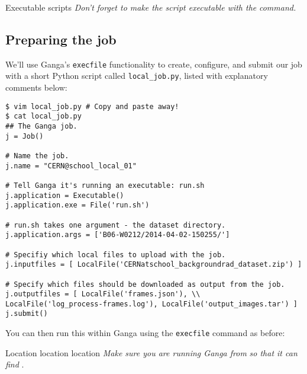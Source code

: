 \begin{warningbox}{Executable scripts}
\emph{Don't forget to make the script executable with the}
\emph{command.}
\end{warningbox}

\subsection{Preparing the job}
\label{creating-configuring-and-submitting-the-job}
We'll use Ganga's \texttt{execfile} functionality to create, configure,
and submit our job with a short Python script called
\texttt{local\_job.py}, listed with explanatory comments below:

\begin{verbatim}
$ vim local_job.py # Copy and paste away!
$ cat local_job.py
## The Ganga job.
j = Job()

# Name the job.
j.name = "CERN@school_local_01"

# Tell Ganga it's running an executable: run.sh
j.application = Executable()
j.application.exe = File('run.sh')

# run.sh takes one argument - the dataset directory.
j.application.args = ['B06-W0212/2014-04-02-150255/']

# Specifiy which local files to upload with the job.
j.inputfiles = [ LocalFile('CERNatschool_backgroundrad_dataset.zip') ]

# Specify which files should be downloaded as output from the job.
j.outputfiles = [ LocalFile('frames.json'), \\
LocalFile('log_process-frames.log'), LocalFile('output_images.tar') ]
j.submit()
\end{verbatim}

You can then run this within Ganga using the \texttt{execfile} command
as before:

\begin{Shaded}
\begin{Highlighting}[]
 \NormalTok{)}
\NormalTok{[} \NormalTok{job output messages ...]}
\end{Highlighting}
\end{Shaded}

\begin{warningbox}{Location location location}
\emph{Make sure you are running Ganga from}
\emph{so that it can find}
.
\end{warningbox}

